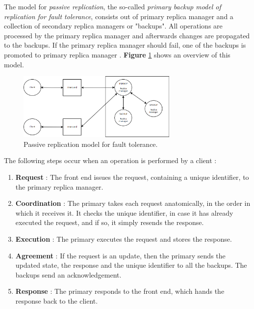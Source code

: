 The model for \emph{passive replication}, the so-called \emph{primary backup model of replication for fault tolerance}, consists out of primary replica manager and a collection of secondary replica managers or "backups". All operations are processed by the primary replica manager and afterwards changes are propagated to the backups. If the primary replica manager should fail, one of the backups is promoted to primary replica manager \cite{Coulouris:2011:DSC:2029110}. \textbf{Figure} \ref{fig:passivereplication} shows an overview of this model.


\begin{figure}[h]
	\begin{center}
		\includegraphics[width=0.7\textwidth]{img/systems-and-architectures/passivereplication}
	\end{center}
	\caption{Passive replication model for fault tolerance.}
	\label{fig:passivereplication}
\end{figure}

The following steps occur when an operation is performed by a client \cite{Coulouris:2011:DSC:2029110}:
\begin{enumerate}
	\item \textbf{Request} : The front end issues the request, containing a unique identifier, to the primary replica manager.
	\item \textbf{Coordination} : The primary takes each request anatomically, in the order in which it receives it. It checks the unique identifier, in case it has already executed the request, and if so, it simply resends the response.
	\item \textbf{Execution} : The primary executes the request and stores the response.
	\item \textbf{Agreement} : If the request is an update, then the primary sends the updated state, the response and the unique identifier to all the backups. The backups send an acknowledgement.
	\item \textbf{Response} : The primary responds to the front end, which hands the response back to the client.
\end{enumerate}

